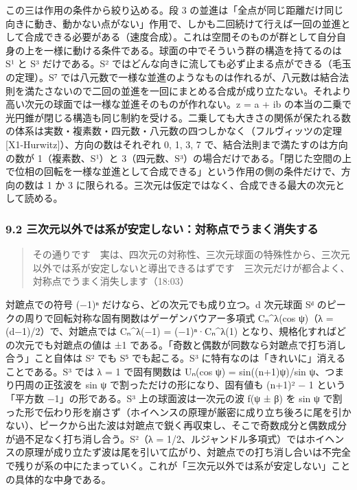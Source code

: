 \documentclass[
  a4paper,
]{ltjsarticle}
\begin{document}
この三は作用の条件から絞り込める。段 3
の並進は「全点が同じ距離だけ同じ向きに動き、動かない点がない」作用で、しかも二回続けて行えば一回の並進として合成できる必要がある（速度合成）。これは空間そのものが群として自分自身の上を一様に動ける条件である。球面の中でそういう群の構造を持てるのは
S¹ と S³ だけである。S²
ではどんな向きに流しても必ず止まる点ができる（毛玉の定理）。S⁷
では八元数で一様な並進のようなものは作れるが、八元数は結合法則を満たさないので二回の並進を一回にまとめる合成が成り立たない。それより高い次元の球面では一様な並進そのものが作れない。z
= a + ib
の本当の二乗で光円錐が閉じる構造も同じ制約を受ける。二乗しても大きさの関係が保たれる数の体系は実数・複素数・四元数・八元数の四つしかなく（フルヴィッツの定理
{[}X1-Hurwitz{]}）、方向の数はそれぞれ 0, 1, 3, 7
で、結合法則まで満たすのは方向の数が 1（複素数、S¹）と
3（四元数、S³）の場合だけである。「閉じた空間の上で位相の回転を一様な並進として合成できる」という作用の側の条件だけで、方向の数は
1 か 3
に限られる。三次元は仮定ではなく、合成できる最大の次元として読める。

\subsubsection{9.2
三次元以外では系が安定しない：対称点でうまく消失する}\label{ux4e09ux6b21ux5143ux4ee5ux5916ux3067ux306fux7cfbux304cux5b89ux5b9aux3057ux306aux3044ux5bfeux79f0ux70b9ux3067ux3046ux307eux304fux6d88ux5931ux3059ux308b}

\begin{quote}
その通りです　実は、四次元の対称性、三次元球面の特殊性から、三次元以外では系が安定しないと導出できるはずです　三次元だけが都合よく、対称点でうまく消失します（18:03）
\end{quote}

対蹠点での符号 (−1)ⁿ だけなら、どの次元でも成り立つ。d 次元球面 Sᵈ
のピークの周りで回転対称な固有関数はゲーゲンバウアー多項式 Cₙ\^{}λ(cos
ψ)（λ = (d−1)/2）で、対蹠点では Cₙ\^{}λ(−1) = (−1)ⁿ·Cₙ\^{}λ(1)
となり、規格化すればどの次元でも対蹠点の値は ±1
である。「奇数と偶数が同数なら対蹠点で打ち消し合う」こと自体は S² でも
S⁵ でも起こる。S³ に特有なのは「きれいに」消えることである。S³ では λ =
1 で固有関数は Uₙ(cos ψ) = sin((n+1)ψ)/sin ψ、つまり円周の正弦波を sin ψ
で割っただけの形になり、固有値も (n+1)² − 1 という「平方数
−1」の形である。S³ 上の球面波は一次元の波 f(ψ ± β) を sin ψ
で割った形で伝わり形を崩さず（ホイヘンスの原理が厳密に成り立ち後ろに尾を引かない）、ピークから出た波は対蹠点で鋭く再収束し、そこで奇数成分と偶数成分が過不足なく打ち消し合う。S²（λ
=
1/2、ルジャンドル多項式）ではホイヘンスの原理が成り立たず波は尾を引いて広がり、対蹠点での打ち消し合いは不完全で残りが系の中にたまっていく。これが「三次元以外では系が安定しない」ことの具体的な中身である。
\end{document}
